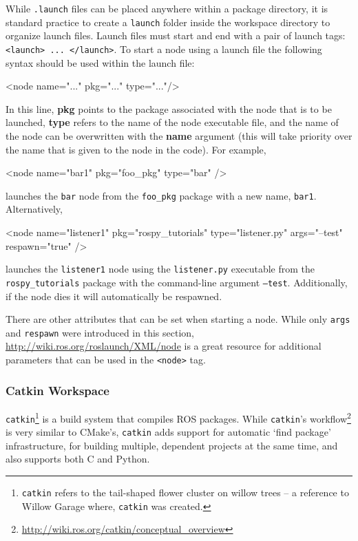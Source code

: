 While \texttt{.launch} files can be placed anywhere within a package directory, it is standard practice to create a \texttt{launch} folder inside the workspace directory to organize launch files.
Launch files must start and end with a pair of launch tags: \texttt{ <launch> ... </launch>}. To start a node using a launch file the following syntax should be used within the launch file:
\begin{gencode}
<node name="..." pkg="..." type="..."/>
\end{gencode}
In this line, \textbf{pkg} points to the package associated with the node that is to be launched, \textbf{type} refers to the name of the node executable file, and the name of the node can be overwritten with the \textbf{name} argument (this will take priority over the name that is given to the node in the code).
For example,
\begin{gencode}
<node name="bar1" pkg="foo_pkg" type="bar" />
\end{gencode}
launches the \texttt{bar} node from the \texttt{foo\_pkg} package with a new name, \texttt{bar1}. Alternatively,
\begin{gencode}
<node name="listener1" pkg="rospy_tutorials" type="listener.py"
     args="--test" respawn="true" />
\end{gencode}
launches the \texttt{listener1} node using the \texttt{listener.py} executable from the \texttt{rospy\_tutorials} package with the command-line argument \texttt{--test}. Additionally, if the node dies it will automatically be respawned.

There are other attributes that can be set when starting a node. While only \texttt{args} and \texttt{respawn} were introduced in this section, \url{http://wiki.ros.org/roslaunch/XML/node} is a great resource for additional parameters that can be used in the \texttt{<node>} tag.

\subsubsection{Catkin Workspace}

\texttt{catkin}\footnote{\texttt{catkin} refers to the tail-shaped flower cluster on willow trees -- a reference to Willow Garage where, \texttt{catkin} was created.} is a build system that compiles ROS packages. While \texttt{catkin}'s workflow\footnote{\url{http://wiki.ros.org/catkin/conceptual_overview}} is very similar to CMake's, \texttt{catkin} adds support for automatic `find package' infrastructure, for building multiple, dependent projects at the same time, and also supports both C and Python.

